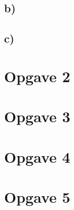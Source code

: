 \documentclass{article}
\begin{document}
\subsection*{b)}

\subsection*{c)}

\section*{Opgave 2}

\section*{Opgave 3}

\section*{Opgave 4}

\section*{Opgave 5}



\end{document}
